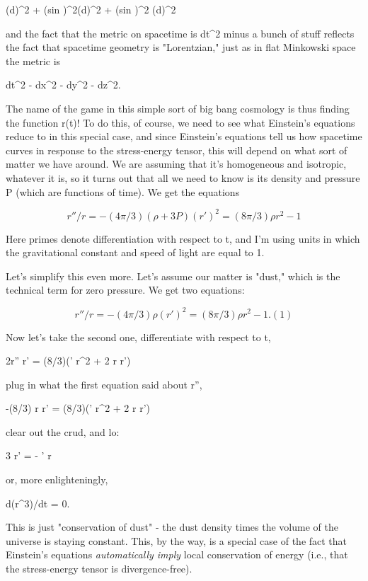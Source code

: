 (d\psi )^{2} + (sin \psi )^{2}{(d\theta )^{2} + (sin \theta )^{2} (d\phi )^{2}}

and the fact that the metric on spacetime is dt^{2} minus a bunch of stuff
reflects the fact that spacetime geometry is "Lorentzian," just as
in flat Minkowski space the metric is

dt^{2} - dx^{2} - dy^{2} - dz^{2}.

The name of the game in this simple sort of big bang cosmology is thus
finding the function r(t)!  To do this, of course, we need to see what
Einstein's equations reduce to in this special case, and since
Einstein's equations tell us how spacetime curves in response to the
stress-energy tensor, this will depend on what sort of matter we have
around.  We are assuming that it's homogeneous and isotropic, whatever
it is, so it turns out that all we need to know is its density \rho  and
pressure P (which are functions of time).  We get the equations

$$
r''/r = -(4\pi /3)(\rho  + 3P)              (r')^{2} = (8\pi /3) \rho  r^{2} - 1 
$$
    

Here primes denote differentiation with respect to t, and I'm using
units in which the gravitational constant and speed of light are equal to 1.

Let's simplify this even more.  Let's assume our matter is "dust," which
is the technical term for zero pressure.  We get two equations:

$$
r''/r = -(4\pi /3)\rho                (r')^{2} = (8\pi /3) \rho  r^{2} - 1.       (1)
$$
    

Now let's take the second one, differentiate with respect to t,

2r'' r' =  (8\pi /3)(\rho ' r^{2} + 2 \rho  r r')

plug in what the first equation said about r'',

-(8\pi /3) \rho  r r' = (8\pi /3)(\rho ' r^{2} + 2 \rho  r r')

clear out the crud, and lo:

3 \rho  r' =  - \rho ' r 

or, more enlighteningly,

d(\rho  r^{3})/dt = 0.

This is just "conservation of dust" - the dust density times the volume
of the universe is staying constant.  This, by the way, is a special
case of the fact that Einstein's equations \emph{automatically imply}
local conservation of energy (i.e., that the stress-energy tensor is
divergence-free).  

